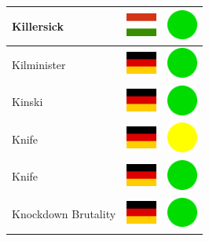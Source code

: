 \documentclass[12pt, a4paper, twoside]{report}
\begin{document}
\begin{center}
\begin{longtable}{|p{5cm}|p{2cm}|p{2cm}|}
 Killersick                                                 & \includegraphics[width=1cm]{../img/flags/hu} &   \includegraphics[width=1cm]{../likes/y} \\ \hline
 Kilminister                                                & \includegraphics[width=1cm]{../img/flags/de} &   \includegraphics[width=1cm]{../likes/y} \\ \hline
 Kinski                                                     & \includegraphics[width=1cm]{../img/flags/de} &   \includegraphics[width=1cm]{../likes/y} \\ \hline
 Knife                                                      & \includegraphics[width=1cm]{../img/flags/de} &   \includegraphics[width=1cm]{../likes/m} \\ \hline
 Knife                                                      & \includegraphics[width=1cm]{../img/flags/de} &   \includegraphics[width=1cm]{../likes/y} \\ \hline
 Knockdown Brutality                                        & \includegraphics[width=1cm]{../img/flags/de} &   \includegraphics[width=1cm]{../likes/y} \\ \hline

\end{longtable}
\end{center}
\end{document}
